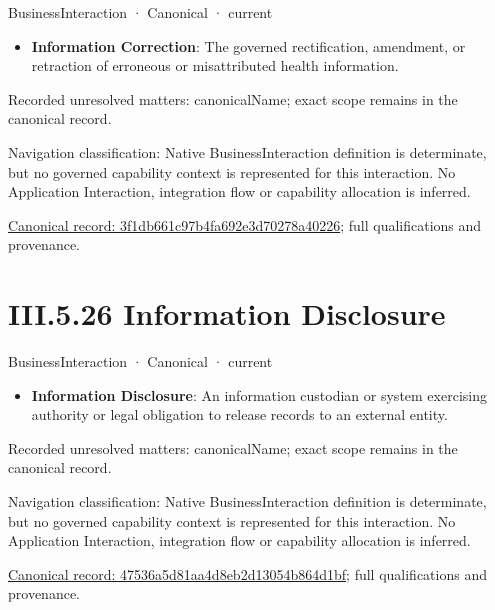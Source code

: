 \label{element:3f1db661c97b4fa692e3d70278a40226}
{\small BusinessInteraction · Canonical · current}\par

\begin{itemize}


\item \textbf{Information Correction}: The governed rectification, amendment, or retraction of erroneous or misattributed health information.

\end{itemize}

{\small Recorded unresolved matters: canonicalName; exact scope remains in the canonical record.}\par
{\small Navigation classification: Native BusinessInteraction definition is determinate, but no governed capability context is represented for this interaction. No Application Interaction, integration flow or capability allocation is inferred.}\par
{\footnotesize \href{../../../../../../../../continuum/business/business-interaction/3f1db661c97b4fa692e3d70278a40226.md}{Canonical record: 3f1db661c97b4fa692e3d70278a40226}; full qualifications and provenance.}\par
\section*{III.5.26 Information Disclosure}
\label{navigation:III.5.26}

\label{element:47536a5d81aa4d8eb2d13054b864d1bf}
{\small BusinessInteraction · Canonical · current}\par

\begin{itemize}


\item \textbf{Information Disclosure}: An information custodian or system exercising authority or legal obligation to release records to an external entity.

\end{itemize}

{\small Recorded unresolved matters: canonicalName; exact scope remains in the canonical record.}\par
{\small Navigation classification: Native BusinessInteraction definition is determinate, but no governed capability context is represented for this interaction. No Application Interaction, integration flow or capability allocation is inferred.}\par
{\footnotesize \href{../../../../../../../../continuum/business/business-interaction/47536a5d81aa4d8eb2d13054b864d1bf.md}{Canonical record: 47536a5d81aa4d8eb2d13054b864d1bf}; full qualifications and provenance.}\par
